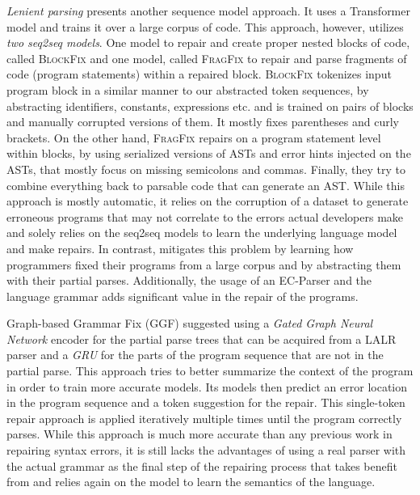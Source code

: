 \emph{Lenient parsing} \citep{Ahmed_2021} presents another sequence model
approach. It uses a Transformer model and trains it over a large corpus of code.
This approach, however, utilizes \emph{two seq2seq models}. One model to repair
and create proper nested blocks of code, called \textsc{BlockFix} and one model,
called \textsc{FragFix} to repair and parse fragments of code (\eg program
statements) within a repaired block. \textsc{BlockFix} tokenizes input program
block in a similar manner to our abstracted token sequences, by abstracting
identifiers, constants, expressions etc. and is trained on pairs of blocks and
manually corrupted versions of them. It mostly fixes parentheses and curly
brackets. On the other hand, \textsc{FragFix} repairs on a program statement
level within blocks, by using serialized versions of ASTs and error hints
injected on the ASTs, that mostly focus on missing semicolons and commas.
Finally, they try to combine everything back to parsable code that can generate
an AST. While this approach is mostly automatic, it relies on the corruption of
a dataset to generate erroneous programs that may not correlate to the errors
actual developers make and solely relies on the seq2seq models to learn the
underlying language model and make repairs. In contrast, \toolname mitigates
this problem by learning how programmers fixed their programs from a large
corpus and by abstracting them with their partial parses. Additionally, the
usage of an EC-Parser and the language grammar adds significant value in the
repair of the programs.

%
Graph-based Grammar Fix (\textsc{GGF}) \citep{Wu2020} suggested using a
\emph{Gated Graph Neural Network} encoder for the partial parse trees that can
be acquired from a LALR parser and a \emph{GRU} for the parts of the program
sequence that are not in the partial parse. This approach tries to better
summarize the context of the program in order to train more accurate models. Its
models then predict an error location in the program sequence and a token
suggestion for the repair. This single-token repair approach is applied
iteratively multiple times until the program correctly parses. While this
approach is much more accurate than any previous work in repairing syntax
errors, it is still lacks the advantages of using a real parser with the actual
grammar as the final step of the repairing process that \toolname takes benefit
from and relies again on the model to learn the semantics of the language.


